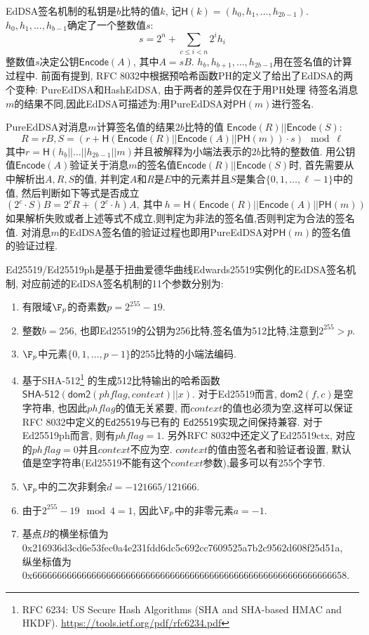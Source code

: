 EdDSA签名机制的私钥是$b$比特的值$k$, 记$\textsf{H}(k) = (h_0, h_1, \ldots, h_{2b-1})$.
$h_0, h_1, \ldots, h_{b-1}$确定了一个整数值$s$:
$$s =  2^n + \sum_{c \leq i < n}2^i h_i$$
整数值$s$决定公钥$\textsf{Encode}(A)$, 其中$A = sB$.
$h_b, h_{b+1}, \ldots, h_{2b-1}$用在签名值的计算过程中.
前面有提到, RFC 8032中根据预哈希函数\textsf{PH}的定义了给出了EdDSA的两个变种:
\textsf{PureEdDSA}和\textsf{HashEdDSA}, 由于两者的差异仅在于用\textsf{PH}处理
待签名消息$m$的结果不同,因此EdDSA可描述为:用\textsf{PureEdDSA}对$\textsf{PH}(m)$进行签名.

\textsf{PureEdDSA}对消息$m$计算签名值的结果$2b$比特的值
$\textsf{Encode}(R) || \textsf{Encode}(S)$: 
$$R = rB, S = \left(r + \textsf{H}\left(\textsf{Encode}(R) || 
\textsf{Encode}(A) || \textsf{PH}(m)\right)\cdot s \right) \mod \ell$$
其中$r = \textsf{H}(h_b || \ldots || h_{2b-1} || m)$并且被解释为小端法表示的$2b$比特的整数值.
用公钥值$\textsf{Encode}(A)$验证关于消息$m$的签名值$\textsf{Encode}(R) || \textsf{Encode}(S)$时,
首先需要从中解析出$A, R, S$的值,
并判定$A$和$R$是$E$中的元素并且$S$是集合$\{0, 1, \ldots, \ell-1\}$中的值,
然后判断如下等式是否成立
$$
(2^c \cdot S) B = 2^c  R + (2^c \cdot h) A,
\ \text{其中}\ h = \textsf{H}(\textsf{Encode}(R) || \textsf{Encode}(A) || \textsf{PH}(m))
$$
如果解析失败或者上述等式不成立,则判定为非法的签名值,否则判定为合法的签名值.
对消息$m$的EdDSA签名值的验证过程也即用\textsf{PureEdDSA}对$\textsf{PH}(m)$的签名值的验证过程.

\textsf{Ed25519}/\textsf{Ed25519ph}是基于扭曲爱德华曲线Edwards25519实例化的EdDSA签名机制, 
对应前述的EdDSA签名机制的11个参数分别为: 
\begin{enumerate}
\item 有限域$\F_p$的奇素数$p = 2^{255} - 19$.
\item 整数$b  = 256$, 也即\textsf{Ed25519}的公钥为256比特,签名值为512比特,注意到$2^{255} > p$.
\item $\F_p$中元素$\{0, 1, \ldots, p-1\}$的255比特的小端法编码.
\item 
基于\textsf{SHA-512}\footnote{
RFC 6234: US Secure Hash Algorithms (SHA and SHA-based HMAC and HKDF).
\url{https://tools.ietf.org/pdf/rfc6234.pdf}}
的生成512比特输出的哈希函数$\textsf{SHA-512}(\textsf{dom2}(phflag, context) || x)$.
对于\textsf{Ed25519}而言, $\textsf{dom2}(f, c)$是空字符串, 也因此$phflag$的值无关紧要,
而$context$的值也必须为空,这样可以保证RFC 8032中定义的$\textsf{Ed25519}$与已有的
$\textsf{Ed25519}$实现之间保持兼容. 
对于\textsf{Ed25519ph}而言, 则有$phflag = 1$. 
另外RFC 8032中还定义了\textsf{Ed25519ctx}, 对应的$phflag = 0$并且$context$不应为空.
$context$的值由签名者和验证者设置,
默认值是空字符串(\textsf{Ed25519}不能有这个$context$参数),最多可以有255个字节.
\item $\F_p$中的二次非剩余$d = -121665/121666$.
\item 由于$2^{255}-19 \mod 4 = 1$, 因此$\F_p$中的非零元素$a = -1$.
\item 基点$B$的横坐标值为\\\textsf{0x216936d3cd6e53fec0a4e231fdd6dc5c692cc7609525a7b2c9562d608f25d51a},\\
纵坐标值为\\
\textsf{0x6666666666666666666666666666666666666666666666666666666666666658}.
\end{enumerate}
